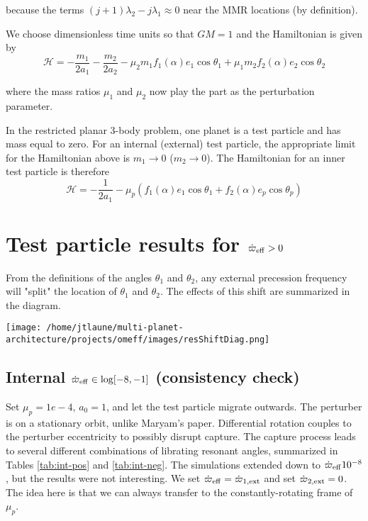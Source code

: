\documentclass[11pt]{article}
\begin{document}
\noindent
because the terms \((j+1)\lambda_2-j\lambda_1\approx 0\) near the MMR locations (by definition).

We choose dimensionless time units so that \(GM=1\) and
the Hamiltonian is given by
\begin{equation}
  \mathcal{H} = -\frac{m_1}{2a_1} -\frac{m_2}{2a_2} - \mu_2 m_1 f_1(\alpha) e_1 \cos\theta_1 + \mu_1 m_2 f_2(\alpha) e_2\cos\theta_2
\end{equation}

\noindent
where the mass ratios \(\mu_1\) and \(\mu_2\) now play the part as the perturbation parameter.

In the restricted planar 3-body problem, one planet is a test particle and has mass equal to zero.
For an internal (external) test particle,
the appropriate limit for the Hamiltonian above is \(m_1\to0\) (\(m_2\to0\)).
The Hamiltonian for an inner test particle is therefore
\begin{equation}
  \mathcal{H} = -\frac{1}{2a_1} - \mu_p( f_1(\alpha) e_1 \cos\theta_1 + f_2(\alpha) e_p\cos\theta_p)
\end{equation}

\noindent

\section{Test particle results for \(\dot\varpi_{\rm eff}>0\)}
\label{sec:org2e0e44c}
From the definitions of the angles \(\theta_1\) and \(\theta_2\),
any external precession frequency will "split" the location
of \(\theta_1\) and \(\theta_2\). The effects of this
shift are summarized in the diagram.

\begin{center}
\texttt{[image: /home/jtlaune/multi-planet-architecture/projects/omeff/images/resShiftDiag.png]}
\end{center}

\subsection{Internal \(\dot\varpi_{\rm eff}\in\log[-8,-1]\) (consistency check)}
\label{sec:org67b2779}
Set \(\mu_p=1e-4\), \(a_0=1\), and let the test particle migrate
outwards. The perturber is on a stationary orbit, unlike Maryam's
paper. Differential rotation couples to the perturber eccentricity to
possibly disrupt capture.  The capture process leads to several
different combinations of librating resonant angles, summarized in
Tables \ref{tab:int-pos} and \ref{tab:int-neg}.  The simulations extended
down to \(\dot\varpi_{\rm eff}10^{-8}\), but the results were not
interesting.  We set \(\dot\varpi_{\rm eff} = \dot\varpi_{1,\rm ext}\)
and set \(\dot\varpi_{2, \rm ext}=0\). The idea here is
that we can always transfer to the constantly-rotating
frame of \(\mu_p\).
\end{document}
